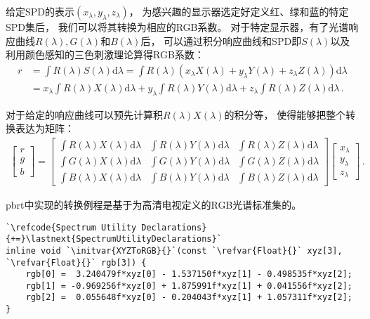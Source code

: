 给定SPD的表示$(x_{\lambda},y_{\lambda},z_{\lambda})$，
为感兴趣的显示器选定好定义红、绿和蓝的特定SPD集后，
我们可以将其转换为相应的RGB系数。
对于特定显示器，有了光谱响应曲线$R(\lambda),G(\lambda)$和$B(\lambda)$后，
可以通过积分响应曲线和SPD即$S(\lambda)$以及利用颜色感知的三色刺激理论算得RGB系数：
\begin{align*}
    r & =\int R(\lambda)S(\lambda)\mathrm{d}\lambda=\int R(\lambda)(x_{\lambda}X(\lambda)+y_{\lambda}Y(\lambda)+z_{\lambda}Z(\lambda))\mathrm{d}\lambda                        \\
      & =x_{\lambda}\int R(\lambda)X(\lambda)\mathrm{d}\lambda+y_{\lambda}\int R(\lambda)Y(\lambda)\mathrm{d}\lambda+z_{\lambda}\int R(\lambda)Z(\lambda)\mathrm{d}\lambda\, .
\end{align*}

对于给定的响应曲线可以预先计算积$R(\lambda)X(\lambda)$的积分等，
使得能够把整个转换表达为矩阵：
\begin{align*}
    \left[\begin{array}{c}
            r \\ g\\ b
        \end{array}\right]=\left[
        \begin{array}{ccc}
            \int R(\lambda)X(\lambda)\mathrm{d}\lambda & \int R(\lambda)Y(\lambda)\mathrm{d}\lambda & \int R(\lambda)Z(\lambda)\mathrm{d}\lambda \\
            \int G(\lambda)X(\lambda)\mathrm{d}\lambda & \int G(\lambda)Y(\lambda)\mathrm{d}\lambda & \int G(\lambda)Z(\lambda)\mathrm{d}\lambda \\
            \int B(\lambda)X(\lambda)\mathrm{d}\lambda & \int B(\lambda)Y(\lambda)\mathrm{d}\lambda & \int B(\lambda)Z(\lambda)\mathrm{d}\lambda
        \end{array}
        \right]\left[\begin{array}{c}
            x_{\lambda} \\ y_{\lambda} \\ z_{\lambda}
        \end{array}\right]\, .
\end{align*}

pbrt中实现的转换例程是基于为高清电视定义的RGB光谱标准集的。
\begin{lstlisting}
`\refcode{Spectrum Utility Declarations}{+=}\lastnext{SpectrumUtilityDeclarations}`
inline void `\initvar{XYZToRGB}{}`(const `\refvar{Float}{}` xyz[3], `\refvar{Float}{}` rgb[3]) {
    rgb[0] =  3.240479f*xyz[0] - 1.537150f*xyz[1] - 0.498535f*xyz[2];
    rgb[1] = -0.969256f*xyz[0] + 1.875991f*xyz[1] + 0.041556f*xyz[2];
    rgb[2] =  0.055648f*xyz[0] - 0.204043f*xyz[1] + 1.057311f*xyz[2];
}
\end{lstlisting}

